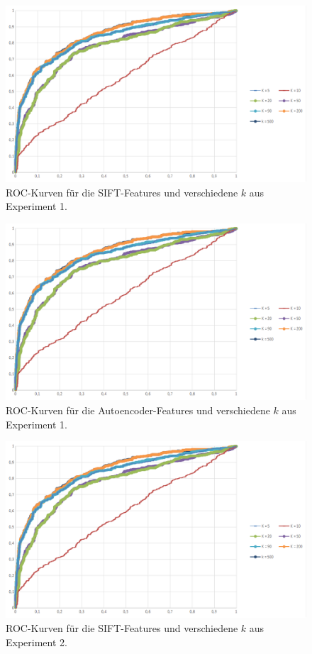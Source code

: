 \begin{figure}
	\centering
	\includegraphics[scale=0.4]{images/roc_ph.png}
	\caption{ROC-Kurven für die SIFT-Features und verschiedene $k$ aus Experiment 1.}
	\label{img:roc1}
\end{figure}

\begin{figure}
	\centering
	\includegraphics[scale=0.4]{images/roc_ph.png}
	\caption{ROC-Kurven für die Autoencoder-Features und verschiedene $k$ aus Experiment 1.}
	\label{img:roc2}
\end{figure}

\begin{figure}
	\centering
	\includegraphics[scale=0.4]{images/roc_ph.png}
	\caption{ROC-Kurven für die SIFT-Features und verschiedene $k$ aus Experiment 2.}
	\label{img:roc3}
\end{figure}

